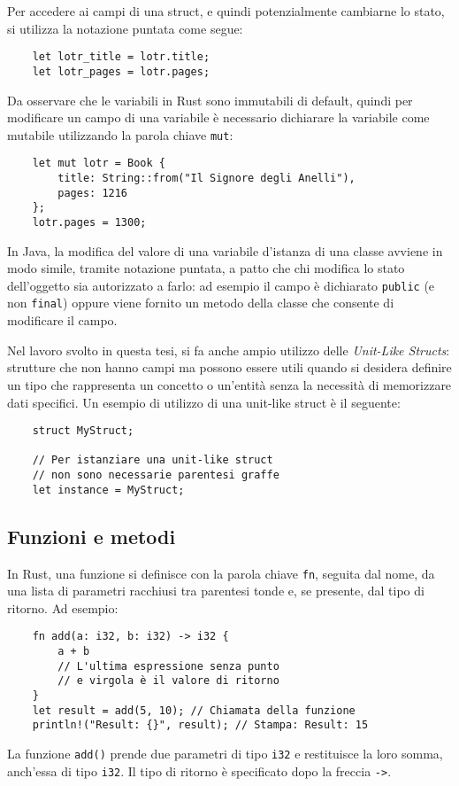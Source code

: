 Per accedere ai campi di una struct, e quindi potenzialmente cambiarne lo stato, si utilizza la notazione puntata come segue:
\begin{verbatim}
    let lotr_title = lotr.title; 
    let lotr_pages = lotr.pages;
\end{verbatim}
Da osservare che le variabili in Rust sono immutabili di default, quindi per modificare un campo di una variabile è necessario dichiarare la variabile come mutabile utilizzando la parola chiave \texttt{mut}:
\begin{verbatim}
    let mut lotr = Book { 
        title: String::from("Il Signore degli Anelli"), 
        pages: 1216 
    };
    lotr.pages = 1300; 
\end{verbatim}
In Java, la modifica del valore di una variabile d'istanza di una classe avviene in modo simile, tramite notazione puntata, a patto che chi modifica lo stato dell'oggetto sia autorizzato a farlo: ad esempio il campo è dichiarato \texttt{public} (e non \texttt{final}) oppure viene fornito un metodo della classe che consente di modificare il campo.

Nel lavoro svolto in questa tesi, si fa anche ampio utilizzo delle \textit{Unit-Like Structs}: strutture che non hanno campi ma possono essere utili quando si desidera definire un tipo che rappresenta un concetto o un'entità senza la necessità di memorizzare dati specifici. Un esempio di utilizzo di una unit-like struct è il seguente:
\begin{verbatim}
    struct MyStruct;

    // Per istanziare una unit-like struct
    // non sono necessarie parentesi graffe
    let instance = MyStruct;
\end{verbatim}
\subsection{Funzioni e metodi}
In Rust, una funzione si definisce con la parola chiave \texttt{fn}, seguita dal nome, da una lista di parametri racchiusi tra parentesi tonde e, se presente, dal tipo di ritorno. Ad esempio:
\begin{verbatim}
    fn add(a: i32, b: i32) -> i32 {
        a + b 
        // L'ultima espressione senza punto 
        // e virgola è il valore di ritorno
    }
    let result = add(5, 10); // Chiamata della funzione
    println!("Result: {}", result); // Stampa: Result: 15
\end{verbatim}
La funzione \texttt{add()} prende due parametri di tipo \texttt{i32} e restituisce la loro somma, anch'essa di tipo \texttt{i32}. Il tipo di ritorno è specificato dopo la freccia \texttt{->}.

